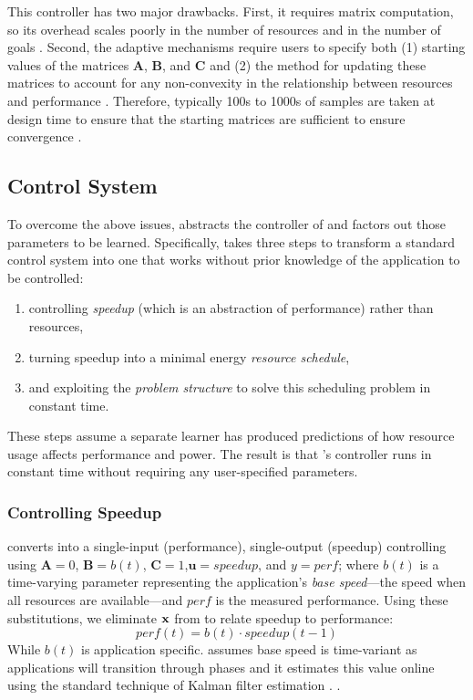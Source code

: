 This controller has two major drawbacks.  First, it requires matrix
computation, so its overhead scales poorly in the number of resources
and in the number of goals \cite{Hellerstein2004a,METE}.  Second, the
adaptive mechanisms require users to specify both (1) starting values
of the matrices $\mathbf{A}$, $\mathbf{B}$, and $\mathbf{C}$ and (2)
the method for updating these matrices to account for any
non-convexity in the relationship between resources and performance
\cite{POET,METE,ControlWare,HandbookControl}.  Therefore, typically
100s to 1000s of samples are taken at design time to ensure that the
starting matrices are sufficient to ensure convergence
\cite{FSE2015,sysid,josep-isca2016}.

\subsection{\SYSTEM{} Control System}
To overcome the above issues, \SYSTEM{} abstracts the controller of
 and factors out those parameters to be learned.
Specifically, \SYSTEM{} takes three steps to transform a standard
control system into one that works without prior knowledge of the
application to be controlled:
\begin{enumerate}[leftmargin=1em]
\item controlling \emph{speedup} (which is an abstraction of performance) rather than resources,
\item turning speedup into a minimal energy \emph{resource schedule},
\item and exploiting the \emph{problem structure} to solve this
  scheduling problem in constant time.
\end{enumerate}
These steps assume a separate learner has produced predictions of how
resource usage affects performance and power.  The result is that
\SYSTEM{}'s controller runs in constant time without requiring any
user-specified parameters.



\subsubsection{Controlling Speedup}
\SYSTEM{} converts  into a single-input
(performance), single-output (speedup) controlling using $\mathbf{A} =
0$, $\mathbf{B} = b(t)$, $\mathbf{C} = 1$,$\mathbf{u}= speedup$, and
$y = perf$; where $b(t)$ is a time-varying parameter representing the
application's \emph{base speed}---the speed when all resources are
available---and $perf$ is the measured performance. Using these
substitutions, we eliminate $\mathbf{x}$ from  to relate
speedup to performance:
\begin{equation}
  perf(t) = b(t) \cdot speedup(t-1) \label{eqn:speedup}
\end{equation}
While $b(t)$ is application specific.  \SYSTEM{} assumes base speed is
time-variant as applications will transition through phases and it
estimates this value online using the standard technique of Kalman
filter estimation \cite{welch2006kalman}. .


